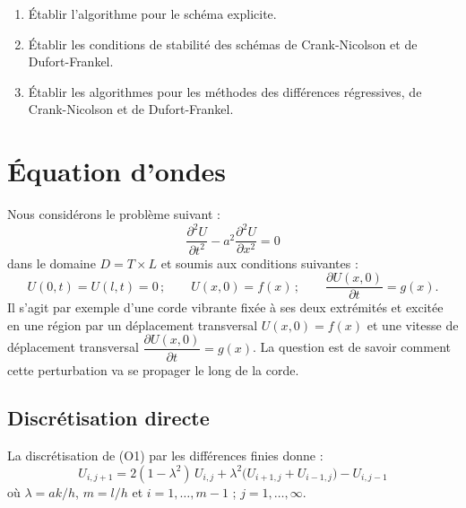 \begin{exercice}[Exercices]
\begin{enumerate}[label=\arabic*)]
  \item Établir l'algorithme pour le schéma explicite.
  \item Établir les conditions de stabilité des schémas de Crank-Nicolson et
        de Dufort-Frankel.
  \item Établir les algorithmes pour les méthodes des différences
        régressives, de Crank-Nicolson et de Dufort-Frankel.
\end{enumerate}
\end{exercice}

\section{Équation d'ondes}

Nous considérons le problème suivant :
\begin{equation}
  \frac{\partial^2 U}{\partial t^2} - a^2\frac{\partial^2 U}{\partial x^2} = 0
  \tag{O1}
\end{equation}
dans le domaine $D = T \times L$ et soumis aux conditions suivantes :
\[
  U(0, t) = U(l, t) = 0 \,; \qquad U(x, 0) = f(x) \,; \qquad
  \frac{\partial U(x, 0)}{\partial t} = g(x) .
\]
Il s'agit par exemple d'une corde vibrante fixée à ses deux extrémités et
excitée en une région par un déplacement transversal $U(x, 0) = f(x)$ et une
vitesse de déplacement transversal $\dfrac{\partial U(x, 0)}{\partial t} = g(x)$.
La question est de savoir comment cette perturbation va se propager le long de
la corde.

\subsection{Discrétisation directe}

La discrétisation de (O1) par les différences finies donne :
\begin{equation}
  U_{i,j+1} = 2(1 - \lambda^2)\,U_{i,j} + \lambda^2\bigl(U_{i+1,j} + U_{i-1,j}\bigr) - U_{i,j-1}
  \tag{O2}
\end{equation}
où $\lambda = ak/h$, $m = l/h$ et $i = 1, \dots, m-1$ ; $j = 1, \dots, \infty$.

